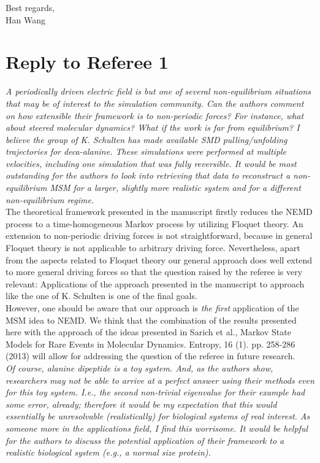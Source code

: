 \documentclass{article}
\begin{document}
\noindent Best regards,\\
Han Wang

\vskip 1cm
\newpage
\section*{Reply to Referee 1}


\textit{
A periodically driven electric field is but one of several
non-equilibrium situations that may be of interest to the simulation
community.  Can the authors comment on how extensible their framework
is to non-periodic forces?  For instance, what about steered molecular
dynamics?  What if the work is far from equilibrium?  I believe the
group of K. Schulten has made available SMD pulling/unfolding
trajectories for deca-alanine. These simulations were performed at
multiple velocities, including one simulation that was fully
reversible.  It would be most outstanding for the authors to look into
retrieving that data to reconstruct a non-equilibrium MSM for a
larger, slightly more realistic system and for a different
non-equilibrium regime.
}\\

The theoretical framework presented in the manuscript firstly reduces the NEMD process to a
time-homogeneous Markov process by utilizing Floquet theory.  An extension
to non-periodic driving forces is not straightforward, because in
general Floquet theory is not applicable to arbitrary driving
force. Nevertheless, apart from the aspects related to Floquet theory our general approach does well extend to more general driving forces so that
the question raised by the referee is very relevant: Applications of the approach presented in the manuscript to approach like the one of K. Schulten is one of the final goals. \\

However, one should be aware that our approach is \emph{the first} application of the MSM idea to NEMD. We think that the combination of the results presented here with the approach of the ideas presented in Sarich et al., Markov State Models for Rare Events in Molecular Dynamics. Entropy, 16 (1). pp. 258-286 (2013)  will allow for addressing the question of the referee in future research.\\


\textit{ Of course, alanine dipeptide is a toy system.  And, as the
  authors show, researchers may not be able to arrive at a perfect
  answer using their methods even for this toy system. I.e., the
  second non-trivial eigenvalue for their example had some error,
  already; therefore it would be my expectation that this would
  essentially be unresolvable (realistically) for biological systems
  of real interest.  As someone more in the applications field, I find
  this worrisome. It would be helpful for the authors to discuss the
  potential application of their framework to a realistic biological
  system (e.g., a normal size protein).
}\\
\end{document}
